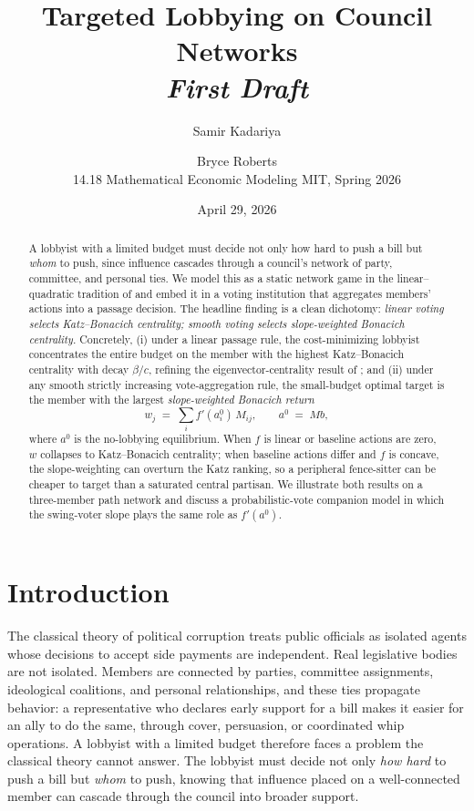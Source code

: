 \documentclass[11pt,letterpaper]{article}
\title{\bfseries Targeted Lobbying on Council Networks\\[0.4em]
{\large \emph{First Draft}}}
\author{Samir Kadariya \and Bryce Roberts\\[0.4em]
\small 14.18 Mathematical Economic Modeling \quad\textbar\quad MIT, Spring 2026}
\date{April 29, 2026}
\theoremstyle{plain}
\theoremstyle{definition}
\theoremstyle{remark}
\begin{document}
\maketitle

\begin{abstract}
\noindent A lobbyist with a limited budget must decide not only how hard to push a bill but \emph{whom} to push, since influence cascades through a council's network of party, committee, and personal ties. We model this as a static network game in the linear--quadratic tradition of \citet{ggg2020} and embed it in a voting institution that aggregates members' actions into a passage decision. The headline finding is a clean dichotomy: \emph{linear voting selects Katz--Bonacich centrality; smooth voting selects slope-weighted Bonacich centrality.} Concretely, (i) under a linear passage rule, the cost-minimizing lobbyist concentrates the entire budget on the member with the highest Katz--Bonacich centrality with decay $\beta/c$, refining the eigenvector-centrality result of \citet{ggg2020}; and (ii) under any smooth strictly increasing vote-aggregation rule, the small-budget optimal target is the member with the largest \emph{slope-weighted Bonacich return}
\[
w_j \;=\; \sum_i f'(a_i^0)\, M_{ij}, \qquad a^0 \;=\; M b,
\]
where $a^0$ is the no-lobbying equilibrium. When $f$ is linear or baseline actions are zero, $w$ collapses to Katz--Bonacich centrality; when baseline actions differ and $f$ is concave, the slope-weighting can overturn the Katz ranking, so a peripheral fence-sitter can be cheaper to target than a saturated central partisan. We illustrate both results on a three-member path network and discuss a probabilistic-vote companion model in which the swing-voter slope plays the same role as $f'(a^0)$.
\end{abstract}


\section{Introduction}
\label{sec:intro}

The classical theory of political corruption \citep{shleifer1993} treats public officials as isolated agents whose decisions to accept side payments are independent. Real legislative bodies are not isolated. Members are connected by parties, committee assignments, ideological coalitions, and personal relationships, and these ties propagate behavior: a representative who declares early support for a bill makes it easier for an ally to do the same, through cover, persuasion, or coordinated whip operations. A lobbyist with a limited budget therefore faces a problem the classical theory cannot answer. The lobbyist must decide not only \emph{how hard} to push a bill but \emph{whom} to push, knowing that influence placed on a well-connected member can cascade through the council into broader support.
\end{document}
